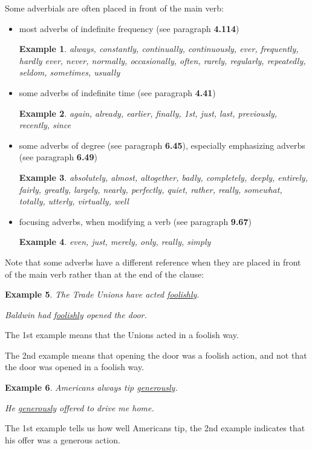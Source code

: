 \documentclass[oneside]{book}
\numberwithin{equation}{section}
\newtheorem{example}{Example}[section]
\begin{document}
%
\noindent{} Some adverbials are often placed in front of the main verb:
\begin{itemize}
    \item most adverbs of indefinite frequency (see paragraph \textbf{4.114})
    \begin{example}
        always, constantly, continually, continuously, ever, frequently, hardly ever, never, normally, occasionally, often, rarely, regularly, repeatedly, seldom, sometimes, usually
    \end{example}
    \item some adverbs of indefinite time (see paragraph \textbf{4.41})
    \begin{example}
        again, already, earlier, finally, 1st, just, last, previously, recently, since
    \end{example}
    \item some adverbs of degree (see paragraph \textbf{6.45}), especially emphasizing adverbs (see paragraph \textbf{6.49})
    \begin{example}
        absolutely, almost, altogether, badly, completely, deeply, entirely, fairly, greatly, largely, nearly, perfectly, quiet, rather, really, somewhat, totally, utterly, virtually, well
    \end{example}
    \item focusing adverbs, when modifying a verb (see paragraph \textbf{9.67})
    \begin{example}
        even, just, merely, only, really, simply
    \end{example}
\end{itemize}
Note that some adverbs have a different reference when they are placed in front of the main verb rather than at the end of the clause:
\begin{example}
    The Trade Unions have acted \underline{foolishly}.
    
    Baldwin had \underline{foolishly} opened the door.
\end{example}
The 1st example means that the Unions acted in a foolish way.

The 2nd example means that opening the door was a foolish action, and not that the door was opened in a foolish way.
\begin{example}
    Americans always tip \underline{generously}.
    
    He \underline{generously} offered to drive me home.
\end{example}
The 1st example tells us how well Americans tip, the 2nd example indicates that his offer was a generous action.
\end{document}

